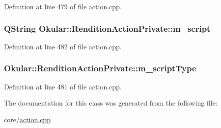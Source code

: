 Definition at line 479 of file action.\+cpp.

\hypertarget{classOkular_1_1RenditionActionPrivate_a1f917096d272f4dcaa6fcb224713fba8}{
\subsubsection[{m\+\_\+script}]{\setlength{\rightskip}{0pt plus 5cm}Q\+String Okular\+::\+Rendition\+Action\+Private\+::m\+\_\+script}}\label{classOkular_1_1RenditionActionPrivate_a1f917096d272f4dcaa6fcb224713fba8}


Definition at line 482 of file action.\+cpp.

\hypertarget{classOkular_1_1RenditionActionPrivate_a438c9fa329e2e9c47bf4b103f83493dc}{
\subsubsection[{m\+\_\+script\+Type}]{ Okular\+::\+Rendition\+Action\+Private\+::m\+\_\+script\+Type}}\label{classOkular_1_1RenditionActionPrivate_a438c9fa329e2e9c47bf4b103f83493dc}


Definition at line 481 of file action.\+cpp.



The documentation for this class was generated from the following file\+:\begin{DoxyCompactItemize}
\item 
core/\hyperlink{action_8cpp}{action.\+cpp}\end{DoxyCompactItemize}
